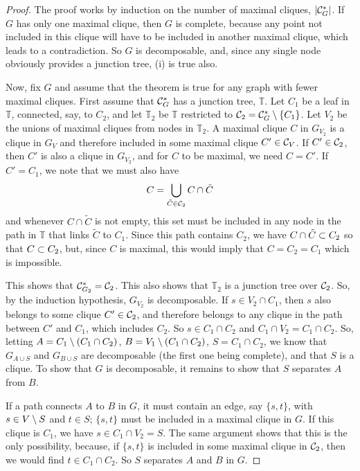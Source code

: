 \begin{proof}
The proof works by induction on the number of maximal
cliques, $|{\mathcal C}^*_G|$. If $G$ has only one maximal clique, then $G$ is complete, because any point not included in this clique will have to be included in another maximal clique, which leads to a contradiction. So $G$ is decomposable, and, since any single node obviously provides a junction tree, (i) is true also. 

Now, fix $G$ and assume that the theorem is true
for any graph with fewer maximal cliques.
First assume that ${\mathcal C}_G^*$ has a junction tree, $\mathbb T$. Let
$C_1$ be a leaf in $\mathbb T$, connected, say, to $C_2$, and let
$\mathbb T_2$ be $\mathbb T$ restricted to ${\mathcal C}_2 = {\mathcal C}_G^* \setminus
\{C_1\}$. 
Let $V_2$ be the unions of
maximal cliques from nodes in $\mathbb T_2$. A maximal clique $C$ in $G_{V_2}$ is a clique in $G_V$ and therefore
included in some maximal clique $C'\in {\mathcal C}_V$. If $C'\in {\mathcal C}_2$, then
$C'$ is also a clique in $G_{V_2}$, and for $C$ to be maximal, we need
$C= C'$. If $C' = C_1$, we note that we must also have
\[
C = \bigcup_{\tilde C\in {\mathcal C}_2} C\cap \tilde C
\]
and whenever $C\cap \tilde C$ is not empty, this set must be included
in any node in the path in $\mathbb T$ that links $\tilde C$ to
$C_1$. Since this path contains $C_2$, we have $C\cap \tilde C\subset C_2$
so that $C\subset C_2$, but, since $C$ is maximal, this would imply that
$C = C_2 = C_1$ which is impossible. 

This shows that ${\mathcal C}_{G_2}^* = {\mathcal C}_2$. This also shows that $\mathbb
T_2$ is a junction tree over ${\mathcal C}_2$. So, by the
induction hypothesis, $G_{V_2}$ is decomposable. If $s\in V_2 \cap
C_1$, then $s$ also belongs to some clique $C'\in {\mathcal C}_2$, and
therefore belongs to any clique in the path between $C'$ and $C_1$,
which includes $C_2$. So $s\in C_1\cap C_2$ and $C_1\cap V_2 = C_1
\cap C_2$. So, letting $A = C_1\setminus (C_1\cap C_2)$, $B = V_1 \setminus
(C_1\cap C_2)$, $S = C_1\cap C_2$, we know that
$G_{A\cup S}$ and $G_{B\cup S}$ are decomposable (the first one being
complete), and that $S$ is a clique. To show that $G$ is decomposable,
it remains to show that $S$ separates $A$ from $B$.  

If a path connects
$A$ to $B$ in $G$, it must contain an edge, say $\{s, t\}$, with
$s\in V\setminus S$ and $t\in S$; $\{s, t\}$ must be included in a maximal clique
in $G$. If this clique is $C_1$, we have $s\in C_1\cap V_2 = S$. The same argument shows that this is the only
possibility, because, if $\{s, t\}$ is included in some
maximal clique in ${\mathcal C}_2$, then we would find $t\in C_1\cap
C_2$. So $S$ separates $A$ and $B$ in $G$.


\end{proof}
